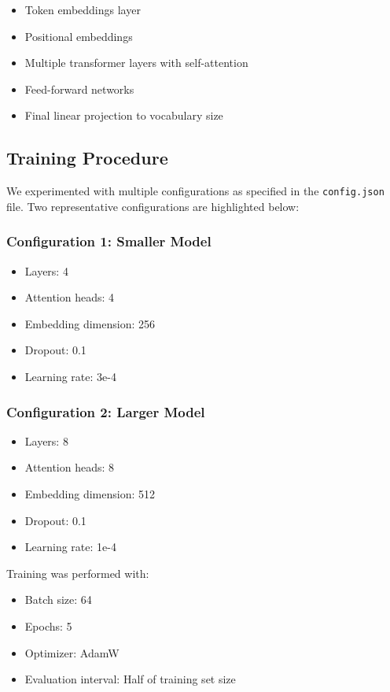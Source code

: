 \begin{itemize}
    \item Token embeddings layer
    \item Positional embeddings
    \item Multiple transformer layers with self-attention
    \item Feed-forward networks
    \item Final linear projection to vocabulary size
\end{itemize}

\subsection{Training Procedure}
We experimented with multiple configurations as specified in the \texttt{config.json} file. Two representative configurations are highlighted below:

\subsubsection*{Configuration 1: Smaller Model}
\begin{itemize}
    \item Layers: 4
    \item Attention heads: 4
    \item Embedding dimension: 256
    \item Dropout: 0.1
    \item Learning rate: 3e-4
\end{itemize}

\subsubsection*{Configuration 2: Larger Model}
\begin{itemize}
    \item Layers: 8
    \item Attention heads: 8
    \item Embedding dimension: 512
    \item Dropout: 0.1
    \item Learning rate: 1e-4
\end{itemize}

Training was performed with:
\begin{itemize}
    \item Batch size: 64
    \item Epochs: 5
    \item Optimizer: AdamW
    \item Evaluation interval: Half of training set size
\end{itemize}

